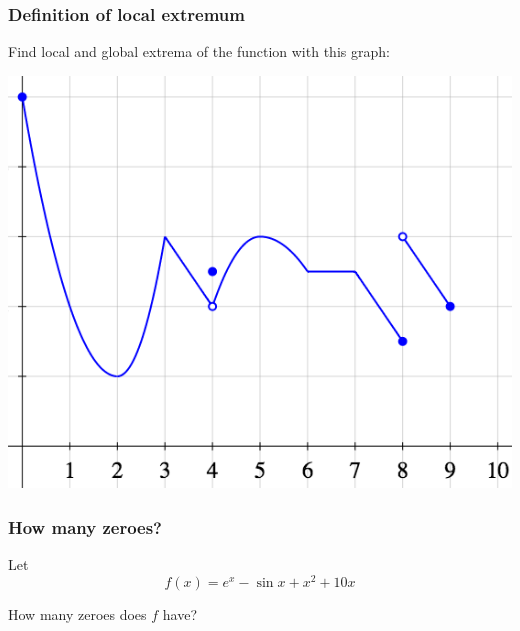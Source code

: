 \documentclass[14pt]{beamer}
\begin{document}
	\begin{frame}
		\frametitle{Definition of local extremum}

		Find local and global extrema of the function with this graph:

		\begin{center}
			\includegraphics[scale=.42]{G13}
		\end{center}
	\end{frame}
	





	\begin{frame}[t]
		\frametitle{How many zeroes?}

		Let
		\[
			f(x) = e^{x}- \sin x + x^{2}+ 10x
		\]

		How many zeroes does $f$ have?
	\end{frame}
\end{document}

